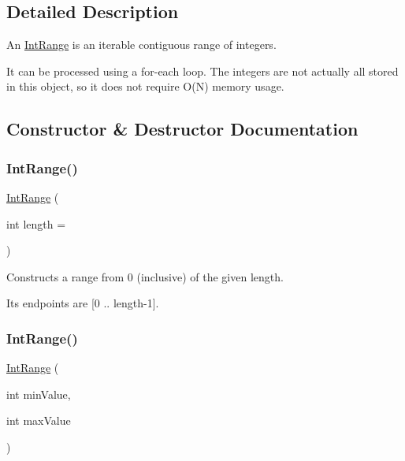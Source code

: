 \subsection{Detailed Description}
An \mbox{\hyperlink{classIntRange}{Int\+Range}} is an iterable contiguous range of integers. 

It can be processed using a for-\/each loop. The integers are not actually all stored in this object, so it does not require O(\+N) memory usage. 

\subsection{Constructor \& Destructor Documentation}
\mbox{\label{classIntRange_a1371e812388f10db89e8cea0edeec000}} 
\subsubsection{\texorpdfstring{Int\+Range()}{IntRange()}\hspace{0.1cm}{\footnotesize\ttfamily [1/2]}}
{\footnotesize\ttfamily \mbox{\hyperlink{classIntRange}{Int\+Range}} (\begin{DoxyParamCaption}\item[{int}]{length = {} }\end{DoxyParamCaption})}



Constructs a range from 0 (inclusive) of the given length. 

Its endpoints are \mbox{[}0 .. length-\/1\mbox{]}. \mbox{\label{classIntRange_a9e8543f0451b16061adafee2d9ad0f84}} 
\subsubsection{\texorpdfstring{Int\+Range()}{IntRange()}\hspace{0.1cm}{\footnotesize\ttfamily [2/2]}}
{\footnotesize\ttfamily \mbox{\hyperlink{classIntRange}{Int\+Range}} (\begin{DoxyParamCaption}\item[{int}]{min\+Value,  }\item[{int}]{max\+Value }\end{DoxyParamCaption})}



